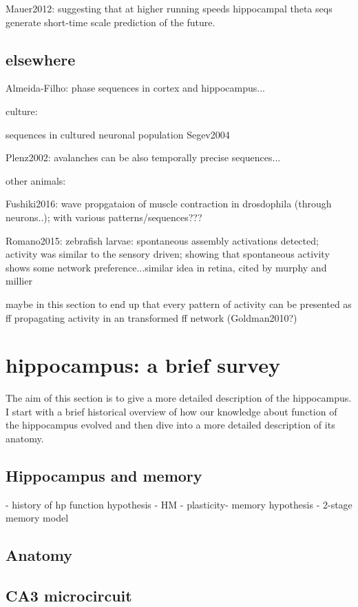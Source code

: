     Mauer2012: suggesting that at higher running speeds hippocampal theta seqs generate short-time scale prediction of the future.


  \subsection{elsewhere}
    
  Almeida-Filho: phase sequences in cortex and hippocampus...

    culture:

      sequences in cultured neuronal population Segev2004

      Plenz2002: avalanches can be also temporally precise sequences...

    other animals: 

      Fushiki2016: wave propgataion of muscle contraction in drosdophila (through neurons..); with various patterns/sequences???


      Romano2015: zebrafish larvae: spontaneous assembly activations detected; activity was similar to the sensory driven; showing that spontaneous activity shows some network preference...similar idea in retina, cited by murphy and millier





    maybe in this section to end up that every pattern of activity can be presented as ff propagating activity in an transformed ff network (Goldman2010?)


\section{hippocampus: a brief survey}
  The aim of this section is to give a more detailed description of the
  hippocampus.  I start with a brief historical overview of how our knowledge
  about function of the hippocampus evolved and then dive into a more detailed
  description of its anatomy. 
  \subsection{Hippocampus and memory}
    - history of hp function hypothesis
    - HM
    - plasticity- memory hypothesis 
    - 2-stage memory model
  \subsection{Anatomy}
  \subsection{CA3 microcircuit}
